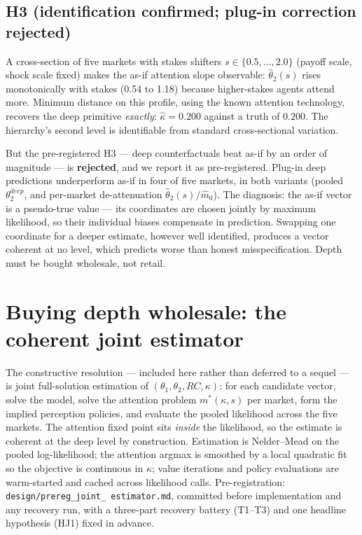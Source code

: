 \documentclass[11pt]{article}
\newcommand{\that}[1]{\widehat{\theta}_{#1}}
\newcommand{\mstar}{m^{*}}
\begin{document}
\subsection{H3 (identification confirmed; plug-in correction rejected)}
\label{sec:h3}
A cross-section of five markets with stakes shifters
$s \in \{0.5, \dots, 2.0\}$ (payoff scale, shock scale fixed) makes the
as-if attention slope observable: $\that{2}(s)$ rises monotonically with
stakes (0.54 to 1.18) because higher-stakes agents attend more. Minimum
distance on this profile, using the known attention technology, recovers
the deep primitive \emph{exactly}: $\widehat{\kappa} = 0.200$ against a
truth of $0.200$. The hierarchy's second level is identifiable from
standard cross-sectional variation.

But the pre-registered H3 --- deep counterfactuals beat as-if by an order
of magnitude --- is \textbf{rejected}, and we report it as pre-registered.
Plug-in deep predictions underperform as-if in four of five markets, in
both variants (pooled $\theta_2^{deep}$, and per-market de-attenuation
$\that{2}(s)/\widehat{m}_0$). The diagnosis: the as-if vector is a
pseudo-true value \citep{white1982} --- its coordinates are chosen jointly
by maximum likelihood, so their individual biases compensate in prediction.
Swapping one coordinate for a deeper estimate, however well identified,
produces a vector coherent at no level, which predicts worse than honest
misspecification. Depth must be bought wholesale, not retail.

\section{Buying depth wholesale: the coherent joint estimator}
\label{sec:joint}
The constructive resolution --- included here rather than deferred to a
sequel --- is joint full-solution estimation of
$(\theta_1, \theta_2, RC, \kappa)$: for each candidate vector, solve the
model, solve the attention problem $\mstar(\kappa, s)$ per market, form the
implied perception policies, and evaluate the pooled likelihood across the
five markets. The attention fixed point sits \emph{inside} the likelihood,
so the estimate is coherent at the deep level by construction. Estimation is
Nelder--Mead on the pooled log-likelihood; the attention argmax is smoothed
by a local quadratic fit so the objective is continuous in $\kappa$; value
iterations and policy evaluations are warm-started and cached across
likelihood calls. Pre-registration: \texttt{design/prereg\_joint\_%
estimator.md}, committed before implementation and any recovery run, with a
three-part recovery battery (T1--T3) and one headline hypothesis (HJ1) fixed
in advance.
\end{document}
